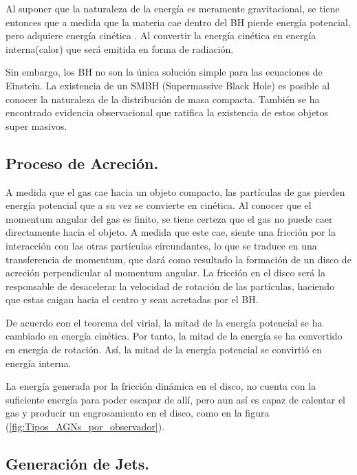 Al suponer que la naturaleza de la energía es meramente gravitacional, se tiene entonces que a medida que la materia cae dentro del BH pierde energía potencial, pero adquiere energía cinética . Al convertir la energía cinética en energía interna(calor) que será emitida en forma de radiación.

Sin embargo, los BH no son la única solución simple para las ecuaciones de Einstein. La existencia de un SMBH (Supermassive Black Hole) es posible al conocer la naturaleza de la distribución de masa compacta. También se ha encontrado evidencia observacional que ratifica la existencia de estos objetos super masivos. 

	\subsection{Proceso de Acreción.}
	\label{subsec:Acretion}

A medida que el gas cae hacia un objeto compacto, las partículas de gas pierden energía potencial que a su vez se convierte en cinética. Al conocer que el momentum angular del gas es finito, se tiene certeza que el gas no puede caer directamente hacia el objeto. A medida que este cae, siente una fricción por la interacción con las otras partículas circundantes, lo que se traduce en una transferencia de momentum, que dará como resultado la formación de un disco de acreción perpendicular al momentum angular. La fricción en el disco será la responsable de desacelerar la velocidad de rotación de las partículas, haciendo que estas caigan hacia el centro y sean acretadas por el BH.  

De acuerdo con el teorema del virial, la mitad de la energía potencial se ha cambiado en energía cinética. Por tanto, la mitad de la energía se ha convertido en energía de rotación. Así, la mitad de la energía potencial se convirtió en energía interna. 

La energía generada por la fricción dinámica en el disco, no cuenta con la suficiente energía para poder escapar de allí, pero aun así es capaz de calentar el gas y producir un engrosamiento en el disco, como en la figura (\ref{fig:Tipos_AGNs_por_observador}).


	\subsection{Generación de Jets.}
	\label{subsec:Generation_Jets}

